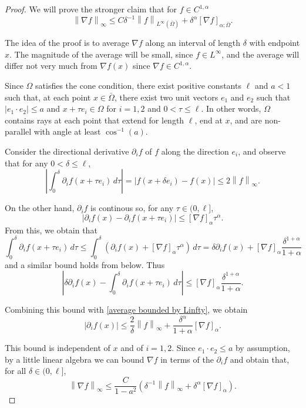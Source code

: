 \documentclass[11pt]{amsart}
\theoremstyle{remark}
\theoremstyle{definition}
\newcommand{\norm}[1]{\left\lVert#1\right\rVert}
\newcommand{\paren}[1]{\left( #1 \right)}
\newcommand{\bracket}[1]{\left[ #1 \right]}
\newcommand{\abs}[1]{\left\lvert #1 \right\rvert}
\newcommand{\del}{\partial}
\newcommand{\grad}{\nabla}
\newcommand{\n}{^{-1}}
\begin{document}
\begin{proof}
We will prove the stronger claim that for $f \in C^{1,\alpha}$
\[ \norm{\grad f}_\infty \leq C \delta\n \norm{f}_{L^\infty(\bar{\Omega})} + \delta^\alpha \bracket{\grad f}_{\alpha;\bar{\Omega}}.\]

The idea of the proof is to average $\grad f$ along an interval of length $\delta$ with endpoint $x$.  The magnitude of the average will be small, since $f \in L^\infty$, and the average will differ not very much from $\grad f(x)$ since $\grad f \in C^{1,\alpha}$.  

Since $\Omega$ satisfies the cone condition, there exist positive constants $\ell$ and $a<1$ such that, at each point $x \in \bar{\Omega}$, there exist two unit vectors $e_1$ and $e_2$ such that $|e_1\cdot e_2| \leq a$ and $x + \tau e_i \in \Omega$ for $i=1,2$ and $0 < \tau \leq \ell$.  In other words, $\Omega$ contains rays at each point that extend for length $\ell$, end at $x$, and are non-parallel with angle at least $\cos\n(a)$.  

Consider the directional derivative $\del_i f$ of $f$ along the direction $e_i$, and observe that for any $0 < \delta \leq \ell$,
\begin{equation} \label{average bounded by Linfty} \abs{\int_0^\delta \del_i f(x + \tau e_i) \,d\tau} = \abs{f(x+\delta e_i) - f(x)} \leq 2 \norm{f}_\infty. \end{equation}

On the other hand, $\del_i f$ is continous so, for any $\tau \in (0,\ell]$,
\[ \abs{\del_i f(x) - \del_i f(x+\tau e_i)} \leq \bracket{\grad f}_\alpha \tau^\alpha. \]
From this, we obtain that
\[ \int_0^\delta \del_i f(x + \tau e_i) \,d\tau \leq \int_0^\delta \paren{\del_i f(x) + \bracket{\grad f}_\alpha \tau^\alpha } \,d\tau = \delta \del_i f(x) + \bracket{\grad f}_\alpha \frac{\delta^{1+\alpha}}{1+\alpha} \]
and a similar bound holds from below.  Thus
\[ \abs{ \delta \del_i f(x) - \int_0^\delta \del_i f(x + \tau e_i) \,d\tau} \leq \bracket{\grad f}_\alpha \frac{\delta^{1+\alpha}}{1+\alpha}. \]

Combining this bound with \eqref{average bounded by Linfty}, we obtain
\[ \abs{\del_i f(x)} \leq \frac{2}{\delta} \norm{f}_\infty + \frac{\delta^\alpha}{1+\alpha} \bracket{\grad f}_\alpha. \]

This bound is independent of $x$ and of $i=1,2$.  Since $e_1 \cdot e_2 \leq a$ by assumption, by a little linear algebra we can bound $\grad f$ in terms of the $\del_i f$ and obtain that, for all $\delta \in (0,\ell]$,
\[ \norm{\grad f}_\infty \leq \frac{C}{1-a^2} \paren{ \delta\n \norm{f}_\infty + \delta^\alpha \bracket{\grad f}_\alpha }. \]

\end{proof}
\end{document}
